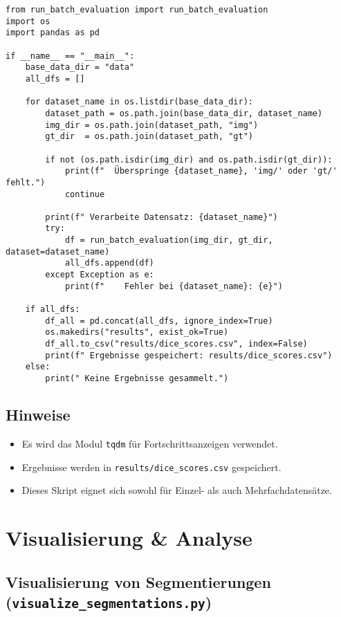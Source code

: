 \documentclass[a4paper,12pt]{article}
\begin{document}
\begin{verbatim}
from run_batch_evaluation import run_batch_evaluation
import os
import pandas as pd

if __name__ == "__main__":
    base_data_dir = "data"
    all_dfs = []

    for dataset_name in os.listdir(base_data_dir):
        dataset_path = os.path.join(base_data_dir, dataset_name)
        img_dir = os.path.join(dataset_path, "img")
        gt_dir  = os.path.join(dataset_path, "gt")

        if not (os.path.isdir(img_dir) and os.path.isdir(gt_dir)):
            print(f"  Überspringe {dataset_name}, 'img/' oder 'gt/' fehlt.")
            continue

        print(f" Verarbeite Datensatz: {dataset_name}")
        try:
            df = run_batch_evaluation(img_dir, gt_dir, dataset=dataset_name)
            all_dfs.append(df)
        except Exception as e:
            print(f"    Fehler bei {dataset_name}: {e}")

    if all_dfs:
        df_all = pd.concat(all_dfs, ignore_index=True)
        os.makedirs("results", exist_ok=True)
        df_all.to_csv("results/dice_scores.csv", index=False)
        print(f" Ergebnisse gespeichert: results/dice_scores.csv")
    else:
        print(" Keine Ergebnisse gesammelt.")
\end{verbatim}

\subsection*{ Hinweise}

\begin{itemize}
  \item Es wird das Modul \texttt{tqdm} für Fortschrittsanzeigen verwendet.
  \item Ergebnisse werden in \texttt{results/dice\_scores.csv} gespeichert.
  \item Dieses Skript eignet sich sowohl für Einzel- als auch Mehrfachdatensätze.
\end{itemize}

\section*{ Visualisierung \& Analyse}

\subsection*{ Visualisierung von Segmentierungen (\texttt{visualize\_segmentations.py})}
\end{document}
